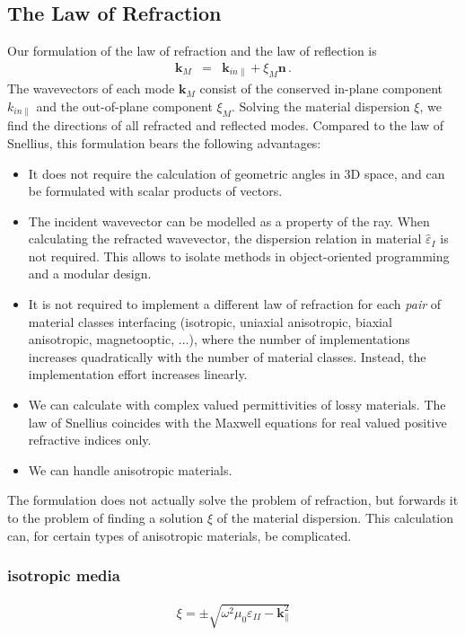 \documentclass[12pt,a4paper,twoside,openright,BCOR10mm,headsepline,titlepage,abstracton,chapterprefix,final]{scrreprt}
\newcommand\Vector[1]{{\mathbf{#1}}}
\newcommand\vacuum{0}
\newcommand\wavenumber{k}
\newcommand\Wavevector{\Vector{\wavenumber}}
\newcommand\Tensor[1]{\hat{#1}}
\newcommand\vacuumpermeability{\scalarpermeability_{\vacuum}}
\newcommand\scalarpermeability{\mu}
\newcommand\permittivity{\Tensor{\scalarpermittivity}}
\newcommand\scalarpermittivity{\varepsilon}
\newcommand\materialone{I}
\newcommand\materialtwo{{II}}
\begin{document}
\subsection{The Law of Refraction}
Our formulation of the law of refraction and the law of reflection is
\begin{eqnarray}
 \Wavevector_{M} &=& \Wavevector_{in\parallel} + \xi_M \Vector{n}\,.\label{eq:xieqn}
\end{eqnarray}
The wavevectors of each mode $\Wavevector_M$ consist of the conserved in-plane component $\wavenumber_{in\parallel}$ and the out-of-plane component $\xi_M$. 
Solving the material dispersion $\xi$, we find the directions of all refracted and reflected modes.
Compared to the law of Snellius, this formulation bears the following advantages:
\begin{itemize}
 \item It does not require the calculation of geometric angles in 3D space, and can be formulated with scalar products of vectors.
 \item The incident wavevector can be modelled as a property of the ray. When calculating the refracted wavevector, 
       the dispersion relation in material $\permittivity_\materialone$ is not required.
       This allows to isolate methods in object-oriented programming and a modular design.
 \item It is not required to implement a different law of refraction for each \emph{pair} of material classes interfacing 
       (isotropic, uniaxial anisotropic, biaxial anisotropic, magnetooptic, ...),
       where the number of implementations increases quadratically with the number of material classes.
       Instead, the implementation effort increases linearly.
 \item We can calculate with complex valued permittivities of lossy materials.
       The law of Snellius coincides with the Maxwell equations for real valued positive refractive indices only.
 \item We can handle anisotropic materials.
\end{itemize}
The formulation does not actually solve the problem of refraction, but forwards it to the problem of finding a solution $\xi$ of the material dispersion. 
This calculation can, for certain types of anisotropic materials, be complicated.

\subsubsection{isotropic media}
\begin{align}
 \xi = \pm \sqrt{\omega^2 \vacuumpermeability \scalarpermittivity_\materialtwo - \Wavevector_{\parallel}^2}
\end{align}
\end{document}
